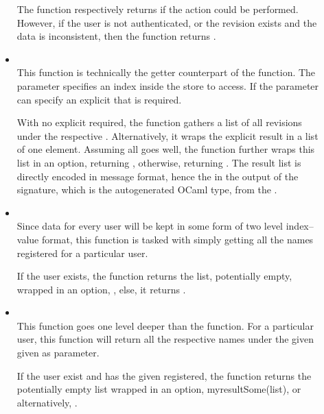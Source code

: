 \begin{description}
\begin{itemize}
  The function respectively returns  if the action could be performed. However, if the user is not authenticated, or the revision exists and the data is inconsistent, then the function returns .

  \item {} \\
  This function is technically the getter counterpart of the  function.
  The  parameter specifies an index inside the store to access.
  If the  parameter can specify an explicit  that is required.

  With no explicit  required, the function gathers a list of all revisions under the respective . Alternatively, it wraps the explicit result in a list of one element. Assuming all goes well, the function further wraps this list in an option, returning , otherwise, returning . The result list is directly encoded in message format, hence the  in the output of the signature, which is the autogenerated OCaml type, from the .

  \item {} \\
  Since data for every user will be kept in some form of two level index--value format, this function is tasked with simply getting all the  names registered for a particular user.

  If the user exists, the function returns the list, potentially empty, wrapped in an option, , else, it returns .

  \item {} \\
  This function goes one level deeper than the  function.
  For a particular user, this function will return all the respective  names under the given  given as parameter.

  If the user exist and has the given  registered, the function returns the potentially empty list wrapped in an option, myresult{Some(list)}, or alternatively, .


\end{itemize}
\end{description}
